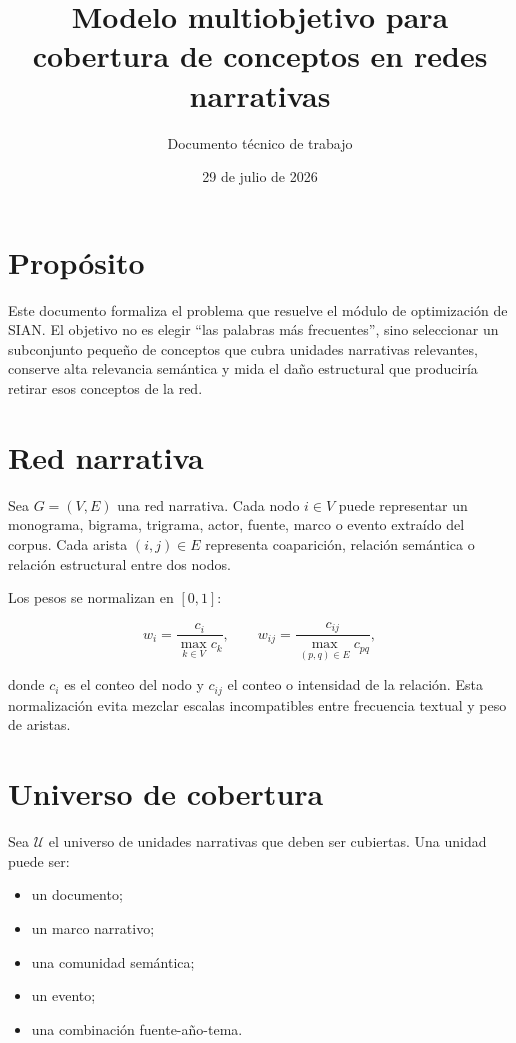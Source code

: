 \documentclass[11pt]{article}
\title{Modelo multiobjetivo para cobertura de conceptos en redes narrativas}
\author{Documento técnico de trabajo}
\date{29 de julio de 2026}
\begin{document}
\maketitle

\section{Propósito}

Este documento formaliza el problema que resuelve el módulo de optimización de SIAN. El objetivo no es elegir ``las palabras más frecuentes'', sino seleccionar un subconjunto pequeño de conceptos que cubra unidades narrativas relevantes, conserve alta relevancia semántica y mida el daño estructural que produciría retirar esos conceptos de la red.

\section{Red narrativa}

Sea $G=(V,E)$ una red narrativa. Cada nodo $i \in V$ puede representar un monograma, bigrama, trigrama, actor, fuente, marco o evento extraído del corpus. Cada arista $(i,j)\in E$ representa coaparición, relación semántica o relación estructural entre dos nodos.

Los pesos se normalizan en $[0,1]$:

\[
w_i = \frac{c_i}{\max_{k\in V} c_k}, \qquad
w_{ij} = \frac{c_{ij}}{\max_{(p,q)\in E} c_{pq}},
\]

donde $c_i$ es el conteo del nodo y $c_{ij}$ el conteo o intensidad de la relación. Esta normalización evita mezclar escalas incompatibles entre frecuencia textual y peso de aristas.

\section{Universo de cobertura}

Sea $\mathcal{U}$ el universo de unidades narrativas que deben ser cubiertas. Una unidad puede ser:

\begin{itemize}
    \item un documento;
    \item un marco narrativo;
    \item una comunidad semántica;
    \item un evento;
    \item una combinación fuente-año-tema.
\end{itemize}
\end{document}
